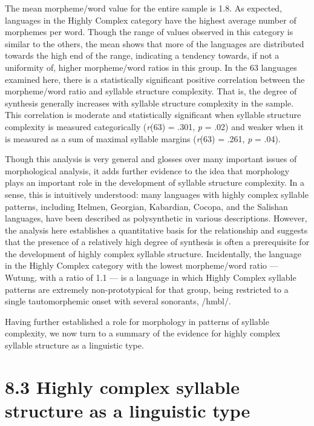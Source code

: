   The mean morpheme/word value for the entire sample is 1.8. As expected, languages in the Highly Complex category have the highest average number of morphemes per word. Though the range of values observed in this category is similar to the others, the mean shows that more of the languages are distributed towards the high end of the range, indicating a tendency towards, if not a uniformity of, higher morpheme/word ratios in this group. In the 63 languages examined here, there is a statistically significant positive correlation between the morpheme/word ratio and syllable structure complexity. That is, the degree of synthesis generally increases with syllable structure complexity in the sample. This correlation is moderate and statistically significant when syllable structure complexity is measured categorically (\textit{r}(63) = .301, \textit{p} = .02) and weaker when it is measured as a sum of maximal syllable margins (\textit{r}(63) = .261, \textit{p} = .04).



  Though this analysis is very general and glosses over many important issues of morphological analysis, it adds further evidence to the idea that morphology plays an important role in the development of syllable structure complexity. In a sense, this is intuitively understood: many languages with highly complex syllable patterns, including Itelmen, Georgian, Kabardian, Cocopa, and the Salishan languages, have been described as polysynthetic in various descriptions. However, the analysis here establishes a quantitative basis for the relationship and suggests that the presence of a relatively high degree of synthesis is often a prerequisite for the development of highly complex syllable structure. Incidentally, the language in the Highly Complex category with the lowest morpheme/word ratio — Wutung, with a ratio of 1.1 — is a language in which Highly Complex syllable patterns are extremely non-prototypical for that group, being restricted to a single tautomorphemic onset with several sonorants, /hmbl/.



  Having further established a role for morphology in patterns of syllable complexity, we now turn to a summary of the evidence for highly complex syllable structure as a linguistic type.


\section{8.3 Highly complex syllable structure as a linguistic type}

